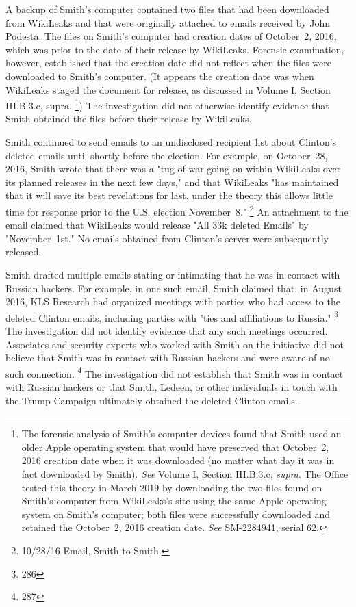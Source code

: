 A backup of Smith's computer contained two files that had been downloaded from WikiLeaks and that were originally attached to emails received by John Podesta.
The files on Smith's computer had creation dates of October~2, 2016, which was prior to the date of their release by WikiLeaks.
Forensic examination, however, established that the creation date did not reflect when the files were downloaded to Smith's computer.
(It appears the creation date was when WikiLeaks staged the document for release, as discussed in Volume I, Section III.B.3.c, supra.%
\footnote{The forensic analysis of Smith's computer devices found that Smith used an older Apple operating system that would have preserved that October~2, 2016 creation date when it was downloaded (no matter what day it was in fact downloaded by Smith).
\textit{See} Volume I, Section III.B.3.c, \textit{supra}.
The Office tested this theory in March 2019 by downloading the two files found on Smith's computer from WikiLeaks's site using the same Apple operating system on Smith's computer;
both files were successfully downloaded and retained the October~2, 2016 creation date.
\textit{See} SM-2284941, serial 62.
})
The investigation did not otherwise identify evidence that Smith obtained the files before their release by WikiLeaks.

Smith continued to send emails to an undisclosed recipient list about Clinton's deleted emails until shortly before the election.
For example, on October~28, 2016, Smith wrote that there was a "tug-of-war going on within WikiLeaks over its planned releases in the next few days," and that WikiLeaks "has maintained that it will save its best revelations for last, under the theory this allows little time for response prior to the U.S. election November~8."%
\footnote{10/28/16 Email, Smith to Smith.}
An attachment to the email claimed that WikiLeaks would release "All 33k deleted Emails" by "November~1st."
No emails obtained from Clinton's server were subsequently released.

Smith drafted multiple emails stating or intimating that he was in contact with Russian hackers.
For example, in one such email, Smith claimed that, in August 2016, KLS Research had organized meetings with parties who had access to the deleted Clinton emails, including parties with "ties and affiliations to Russia."%
\footnote{286}
The investigation did not identify evidence that any such meetings occurred.
Associates and security experts who worked with Smith on the initiative did not believe that Smith was in contact with Russian hackers and were aware of no such connection.%
\footnote{287}
The investigation did not establish that Smith was in contact with Russian hackers or that Smith, Ledeen, or other individuals in touch with the Trump Campaign ultimately obtained the deleted Clinton emails.

